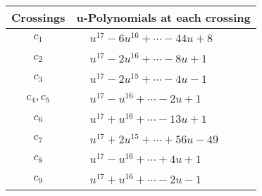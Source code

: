 \documentclass[1p]{elsarticle_modified}
\theoremstyle{definition}
\begin{document}
\begin{tabular}{m{50pt}|m{274pt}}
Crossings & \hspace{64pt}u-Polynomials at each crossing \\
\hline $$\begin{aligned}c_{1}\end{aligned}$$&$\begin{aligned}
&u^{17}-6 u^{16}+\cdots-44 u+8
\end{aligned}$\\
\hline $$\begin{aligned}c_{2}\end{aligned}$$&$\begin{aligned}
&u^{17}-2 u^{16}+\cdots-8 u+1
\end{aligned}$\\
\hline $$\begin{aligned}c_{3}\end{aligned}$$&$\begin{aligned}
&u^{17}-2 u^{15}+\cdots-4 u-1
\end{aligned}$\\
\hline $$\begin{aligned}c_{4},c_{5}\end{aligned}$$&$\begin{aligned}
&u^{17}- u^{16}+\cdots-2 u+1
\end{aligned}$\\
\hline $$\begin{aligned}c_{6}\end{aligned}$$&$\begin{aligned}
&u^{17}+u^{16}+\cdots-13 u+1
\end{aligned}$\\
\hline $$\begin{aligned}c_{7}\end{aligned}$$&$\begin{aligned}
&u^{17}+2 u^{15}+\cdots+56 u-49
\end{aligned}$\\
\hline $$\begin{aligned}c_{8}\end{aligned}$$&$\begin{aligned}
&u^{17}- u^{16}+\cdots+4 u+1
\end{aligned}$\\
\hline $$\begin{aligned}c_{9}\end{aligned}$$&$\begin{aligned}
&u^{17}+u^{16}+\cdots-2 u-1
\end{aligned}$\\

\end{tabular}
\end{document}

